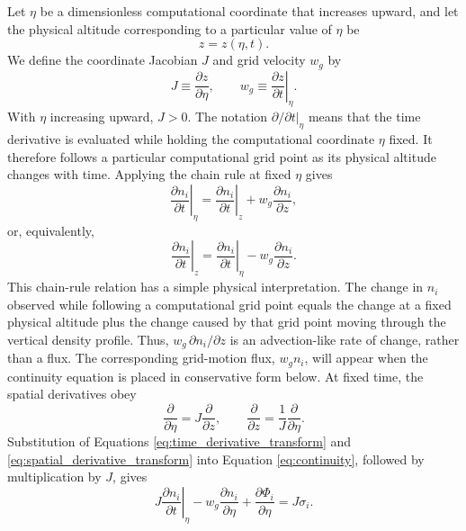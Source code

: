 \documentclass[twocolumn]{aastex631}
\begin{document}
Let $\eta$ be a dimensionless computational coordinate that increases upward,
and let the physical altitude corresponding to a particular value of $\eta$
be
\begin{equation}
  z = z(\eta,t).
\end{equation}
We define the coordinate Jacobian $J$ and grid velocity $w_g$ by
\begin{equation}
  J \equiv \frac{\partial z}{\partial\eta},
  \qquad
  w_g \equiv \left.\frac{\partial z}{\partial t}\right|_\eta .
  \label{eq:grid_definitions}
\end{equation}
With $\eta$ increasing upward, $J>0$. The notation
$\left.\partial/\partial t\right|_\eta$ means that the time derivative is
evaluated while holding the computational coordinate $\eta$ fixed. It
therefore follows a particular computational grid point as its physical
altitude changes with time. Applying the chain rule at fixed $\eta$ gives
\begin{equation}
  \left.\frac{\partial n_i}{\partial t}\right|_\eta
  =
  \left.\frac{\partial n_i}{\partial t}\right|_z
  + w_g\frac{\partial n_i}{\partial z},
\end{equation}
or, equivalently,
\begin{equation}
  \left.\frac{\partial n_i}{\partial t}\right|_z
  =
  \left.\frac{\partial n_i}{\partial t}\right|_\eta
  - w_g\frac{\partial n_i}{\partial z}.
  \label{eq:time_derivative_transform}
\end{equation}
This chain-rule relation has a simple physical interpretation. The change in
$n_i$ observed while following a computational grid point equals the change
at a fixed physical altitude plus the change caused by that grid point moving
through the vertical density profile. Thus,
$w_g\,\partial n_i/\partial z$ is an advection-like rate of change, rather
than a flux. The corresponding grid-motion flux, $w_g n_i$, will appear when
the continuity equation is placed in conservative form below.
At fixed time, the spatial derivatives obey
\begin{equation}
  \frac{\partial}{\partial\eta}
  = J\frac{\partial}{\partial z},
  \qquad
  \frac{\partial}{\partial z}
  = \frac{1}{J}\frac{\partial}{\partial\eta}.
  \label{eq:spatial_derivative_transform}
\end{equation}
Substitution of Equations \eqref{eq:time_derivative_transform} and
\eqref{eq:spatial_derivative_transform} into Equation
\eqref{eq:continuity}, followed by multiplication by $J$, gives
\begin{equation}
  J\left.\frac{\partial n_i}{\partial t}\right|_\eta
  - w_g\frac{\partial n_i}{\partial\eta}
  + \frac{\partial\Phi_i}{\partial\eta}
  = J\sigma_i .
  \label{eq:continuity_eta_nonconservative}
\end{equation}
\end{document}
